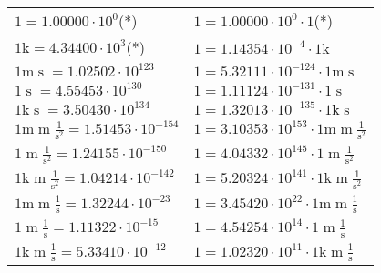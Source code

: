 \begin{center}
\begin{longtable}{l l}
{\color{black}$1 \bm{\mathrm{ }}{}{}{}{} = 1.00000\cdot10^{0} $}\quad(*) & {\color{black}$ 1 = 1.00000\cdot10^{0} \cdot 1 \bm{\mathrm{ }}{}{}{}{}$}\quad(*)\\
{\color{gray}$1 \bm{\mathrm{ k}}{}{}{}{} = 4.34400\cdot10^{3} $}\quad(*) & {\color{gray}$ 1 = 1.14354\cdot10^{-4} \cdot 1 \bm{\mathrm{ k}}{}{}{}{}$}  \\
{\color{gray}$1 \bm{\mathrm{ m}}{}{\operatorname{s}}{}{} = 1.02502\cdot10^{123} $}   & {\color{gray}$ 1 = 5.32111\cdot10^{-124} \cdot 1 \bm{\mathrm{ m}}{}{\operatorname{s}}{}{}$}  \\
{\color{black}$1 \bm{\mathrm{ }}{}{\operatorname{s}}{}{} = 4.55453\cdot10^{130} $}   & {\color{black}$ 1 = 1.11124\cdot10^{-131} \cdot 1 \bm{\mathrm{ }}{}{\operatorname{s}}{}{}$}  \\
{\color{gray}$1 \bm{\mathrm{ k}}{}{\operatorname{s}}{}{} = 3.50430\cdot10^{134} $}   & {\color{gray}$ 1 = 1.32013\cdot10^{-135} \cdot 1 \bm{\mathrm{ k}}{}{\operatorname{s}}{}{}$}  \\
{\color{gray}$1 \bm{\mathrm{ m}}{\operatorname{m}}\frac1{\operatorname{s}^2}{}{} = 1.51453\cdot10^{-154} $}   & {\color{gray}$ 1 = 3.10353\cdot10^{153} \cdot 1 \bm{\mathrm{ m}}{\operatorname{m}}\frac1{\operatorname{s}^2}{}{}$}  \\
{\color{black}$1 \bm{\mathrm{ }}{\operatorname{m}}\frac1{\operatorname{s}^2}{}{} = 1.24155\cdot10^{-150} $}   & {\color{black}$ 1 = 4.04332\cdot10^{145} \cdot 1 \bm{\mathrm{ }}{\operatorname{m}}\frac1{\operatorname{s}^2}{}{}$}  \\
{\color{gray}$1 \bm{\mathrm{ k}}{\operatorname{m}}\frac1{\operatorname{s}^2}{}{} = 1.04214\cdot10^{-142} $}   & {\color{gray}$ 1 = 5.20324\cdot10^{141} \cdot 1 \bm{\mathrm{ k}}{\operatorname{m}}\frac1{\operatorname{s}^2}{}{}$}  \\
{\color{gray}$1 \bm{\mathrm{ m}}{\operatorname{m}}\frac1{\operatorname{s}}{}{} = 1.32244\cdot10^{-23} $}   & {\color{gray}$ 1 = 3.45420\cdot10^{22} \cdot 1 \bm{\mathrm{ m}}{\operatorname{m}}\frac1{\operatorname{s}}{}{}$}  \\
{\color{black}$1 \bm{\mathrm{ }}{\operatorname{m}}\frac1{\operatorname{s}}{}{} = 1.11322\cdot10^{-15} $}   & {\color{black}$ 1 = 4.54254\cdot10^{14} \cdot 1 \bm{\mathrm{ }}{\operatorname{m}}\frac1{\operatorname{s}}{}{}$}  \\
{\color{gray}$1 \bm{\mathrm{ k}}{\operatorname{m}}\frac1{\operatorname{s}}{}{} = 5.33410\cdot10^{-12} $}   & {\color{gray}$ 1 = 1.02320\cdot10^{11} \cdot 1 \bm{\mathrm{ k}}{\operatorname{m}}\frac1{\operatorname{s}}{}{}$}  \\

\end{longtable}
\end{center}
